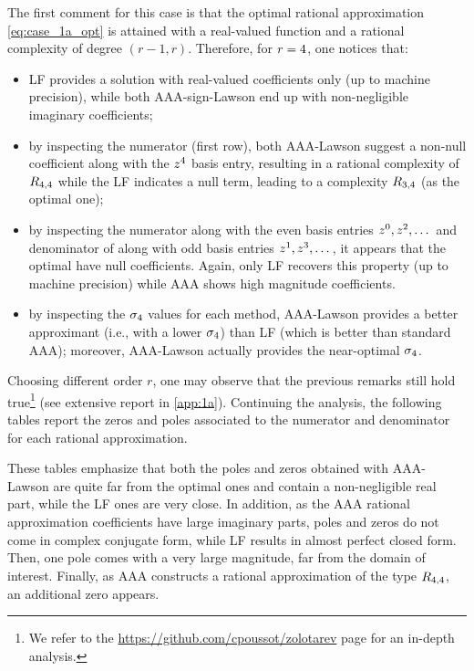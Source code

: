 The first comment for this case is that the optimal rational approximation \cref{eq:case_1a_opt} is attained with a real-valued function and a rational complexity of degree $(r-1,r)$. Therefore, for $r=4$, one notices that:
\begin{itemize}
    \item LF provides a solution with real-valued coefficients only (up to machine precision), while both AAA-sign-Lawson end up with non-negligible imaginary coefficients;
    \item by inspecting the numerator (first row), both AAA-Lawson suggest a non-null coefficient along with the $z^4$ basis entry, resulting in a rational complexity of $R_{4,4}$ while the LF indicates a null term, leading to a complexity $R_{\fpeval{\nLocal-1},\nLocal}$ (as the optimal one);
    \item by inspecting the numerator along with the even basis entries $z^0,z^2,\dots$ and denominator of along with odd  basis entries $z^1,z^3,\dots$, it appears that the optimal have null coefficients. Again, only LF recovers this property (up to machine precision) while AAA shows high magnitude coefficients.
    \item by inspecting the $\sigma_4$ values for each method, AAA-Lawson provides a better approximant (i.e., with a lower $\sigma_4$) than LF (which is better than standard AAA); moreover, AAA-Lawson actually provides the near-optimal $\sigma_4$.
\end{itemize}
Choosing different order $r$, one may observe that the previous remarks still hold true\footnote{We refer to the \url{https://github.com/cpoussot/zolotarev} page for an in-depth analysis.} (see extensive report in \cref{app:1a}). Continuing the analysis, the following tables report the zeros and poles associated to the numerator and denominator for each rational approximation. 



These tables emphasize that both the poles and zeros obtained with AAA-Lawson are quite far from the optimal ones and contain a non-negligible real part, while the LF ones are very close. In addition, as the AAA rational approximation coefficients have large imaginary parts, poles and zeros do not come in complex conjugate form, while LF results in almost perfect closed form. Then, one pole comes with a very large magnitude, far from the domain of interest. Finally, as AAA constructs a rational approximation of the type $R_{4,4}$, an additional zero appears.

